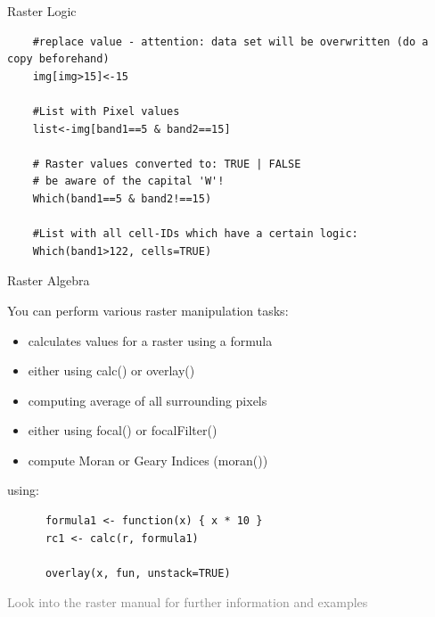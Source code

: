 \begin{frame}[fragile]{Raster Logic}

     \begin{lstlisting}
	#replace value - attention: data set will be overwritten (do a copy beforehand)
	img[img>15]<-15 
	
	#List with Pixel values
	list<-img[band1==5 & band2==15] 
	
	# Raster values converted to: TRUE | FALSE
	# be aware of the capital 'W'!
	Which(band1==5 & band2!==15)

	#List with all cell-IDs which have a certain logic:
	Which(band1>122, cells=TRUE) 

   \end{lstlisting}

\end{frame}


\begin{frame}[fragile]{Raster Algebra}

    You can perform various raster manipulation tasks:
     \begin{itemize}
     \item calculates values for a raster using a formula
     \item either using calc() or overlay()
     \item computing average of all surrounding pixels
     \item either using focal() or focalFilter()
     \item compute Moran or Geary Indices (moran())
    \end{itemize}

    using:

    \begin{lstlisting}
	  formula1 <- function(x) { x * 10 }
	  rc1 <- calc(r, formula1)

	  overlay(x, fun, unstack=TRUE)

   \end{lstlisting}

      \bigskip 

      \begin{large}\textcolor{gray}{Look into the raster manual for further information and examples}\end{large}


\end{frame}

